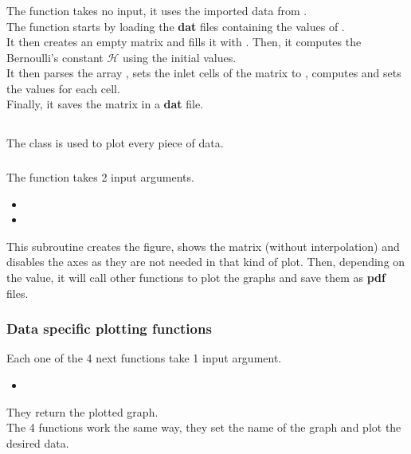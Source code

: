 \subsubsection{\textcolor{func}{}}
The function  takes no input, it uses the imported data
from .\\
The function starts by loading the \textbf{dat} files containing the values of
.\\
It then creates an empty matrix  and fills it with .
Then, it computes the Bernoulli's constant $\mathcal{H}$ using the initial
values.\\
It then parses the array , sets the inlet cells of the
 matrix to , computes and sets the values for
each cell.\\
Finally, it saves the matrix in a \textbf{dat} file.

\subsection{}
The class is used to plot every piece of data.

\subsubsection{\textcolor{func}{}}
The function  takes 2 input arguments.
\begin{itemize}
      \item {}
      \item {}
\end{itemize}
This subroutine creates the figure, shows the matrix  (without
interpolation) and disables the axes as they are not needed in that kind of
plot. Then, depending on the  value, it will call other 
functions to plot the graphs and save them as \textbf{pdf} files.

\subsubsection{Data specific plotting functions}
Each one of the 4 next functions take 1 input argument.
\begin{itemize}
      \item {}
\end{itemize}
They return the plotted graph.\\
The 4 functions work the same way, they set the name of the graph and plot the
desired data.

